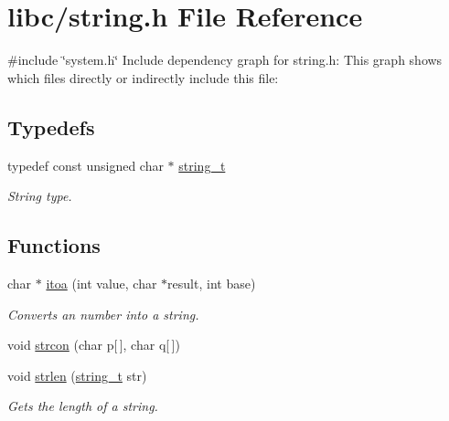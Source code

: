 \hypertarget{a00029}{}\section{libc/string.h File Reference}
\label{a00029}
{\ttfamily \#include \char`\"{}system.\+h\char`\"{}}\newline
Include dependency graph for string.\+h\+:
This graph shows which files directly or indirectly include this file\+:
\subsection*{Typedefs}
\begin{DoxyCompactItemize}
\item 
typedef const unsigned char $\ast$ \hyperlink{a00029_ada436671bc57dfd805a9f3974c81e618_ada436671bc57dfd805a9f3974c81e618}{string\+\_\+t}
\begin{DoxyCompactList}\small\item\em String type. \end{DoxyCompactList}\end{DoxyCompactItemize}
\subsection*{Functions}
\begin{DoxyCompactItemize}
\item 
char $\ast$ \hyperlink{a00029_a22e98a8cf2e2c79d738830b387cace28_a22e98a8cf2e2c79d738830b387cace28}{itoa} (int value, char $\ast$result, int base)
\begin{DoxyCompactList}\small\item\em Converts an number into a string. \end{DoxyCompactList}\item 
void \hyperlink{a00029_a013b85760fd6ecea52a8c8fdd8cf87c9_a013b85760fd6ecea52a8c8fdd8cf87c9}{strcon} (char p\mbox{[}$\,$\mbox{]}, char q\mbox{[}$\,$\mbox{]})
\item 
void \hyperlink{a00029_aaab1d72644d487f9c176d357a9e85bb1_aaab1d72644d487f9c176d357a9e85bb1}{strlen} (\hyperlink{a00029_ada436671bc57dfd805a9f3974c81e618_ada436671bc57dfd805a9f3974c81e618}{string\+\_\+t} str)
\begin{DoxyCompactList}\small\item\em Gets the length of a string. \end{DoxyCompactList}\end{DoxyCompactItemize}


